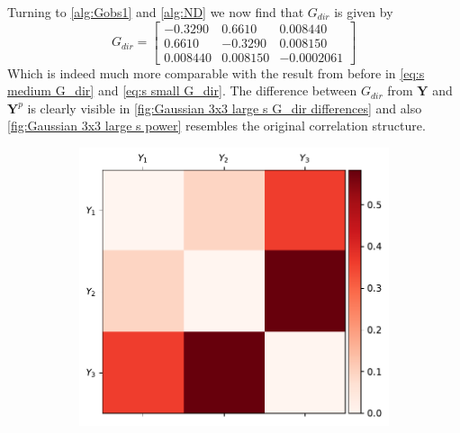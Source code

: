 \documentclass[../Thesis.tex]{subfiles}
\begin{document}
Turning to \autoref{alg:Gobs1} and \autoref{alg:ND} we now find that $G_{dir}$ is given by
$$G_{dir} =
    \begin{bmatrix}
        -0.3290  & 0.6610   & 0.008440   \\
        0.6610   & -0.3290  & 0.008150   \\
        0.008440 & 0.008150 & -0.0002061
    \end{bmatrix}
$$
Which is indeed much more comparable with the result from before in \autoref{eq:s medium G_dir} and \autoref{eq:s small G_dir}. The difference between $G_{dir}$ from $\boldsymbol Y$ and $\boldsymbol Y^p$ is clearly visible in \autoref{fig:Gaussian 3x3 large s G_dir differences} and also \autoref{fig:Gaussian 3x3 large s power} resembles the original correlation structure.
\begin{figure}[H]
    \centering
    \begin{subfigure}[t]{0.49\textwidth}
        \centering
        \includegraphics[width=\linewidth]{figures/ND examples/Gaussian 3x3 large s.pdf}
        \caption{}
        \label{fig:Gaussian 3x3 large s}
    \end{subfigure}%
    ~
    \begin{subfigure}[t]{0.49\textwidth}
        \centering

\end{subfigure}
\end{figure}
\end{document}
